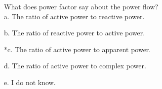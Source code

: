 
What does power factor say about the power flow?\\

a. The ratio of active power to reactive power.

b. The ratio of reactive power to active power.

*c. The ratio of active power to apparent power.

d. The ratio of active power to complex power.

e. I do not know.\\
